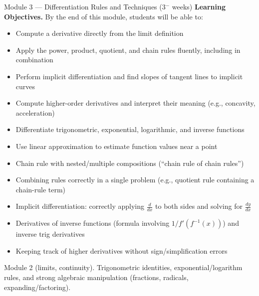 \documentclass[11pt]{article}
\newcommand{\loheader}{\textbf{Learning Objectives.} By the end of this module, students will be able to:}
\begin{document}
\begin{modulebox}{Module 3 --- Differentiation Rules and Techniques \hfill (3$^-$ weeks)}
\loheader
\begin{itemize}[nosep]
  \item Compute a derivative directly from the limit definition
  \item Apply the power, product, quotient, and chain rules fluently, including in combination
  \item Perform implicit differentiation and find slopes of tangent lines to implicit curves
  \item Compute higher-order derivatives and interpret their meaning (e.g., concavity, acceleration)
  \item Differentiate trigonometric, exponential, logarithmic, and inverse functions
  \item Use linear approximation to estimate function values near a point
\end{itemize}
\end{modulebox}

\begin{diffbox}
\begin{itemize}[nosep]
  \item Chain rule with nested/multiple compositions (``chain rule of chain rules'')
  \item Combining rules correctly in a single problem (e.g., quotient rule containing a chain-rule term)
  \item Implicit differentiation: correctly applying $\frac{d}{dx}$ to both sides and solving for $\frac{dy}{dx}$
  \item Derivatives of inverse functions (formula involving $1/f'(f^{-1}(x))$) and inverse trig derivatives
  \item Keeping track of higher derivatives without sign/simplification errors
\end{itemize}
\end{diffbox}

\begin{prereqbox}
Module 2 (limits, continuity). Trigonometric identities, exponential/logarithm
rules, and strong algebraic manipulation (fractions, radicals, expanding/factoring).
\end{prereqbox}

\end{document}
